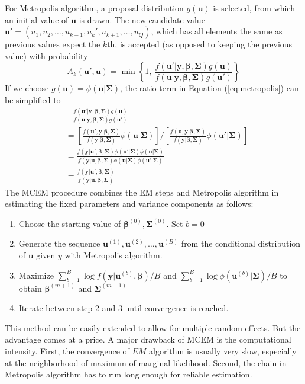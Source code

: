 For Metropolis algorithm, a proposal distribution $g(\bm u)$ is selected, from which an initial
value of $\bm u$ is drawn. The new candidate value $\bm u' = (u_1, u_2, \ldots,u_{k-1}, u_k',
u_{k+1}, \ldots, u_Q)$, which has all elements the same as previous values expect the $k$th,   is
accepted (as opposed to keeping the previous value) with probability
\begin{equation}\label{eq:metropolis}
A_k(\bm u', \bm u) = \min \left\{1, ~\frac{f(\bm u'|\bm y, \bm \beta, \bm \Sigma)g(\bm u)}{f(\bm
	u|\bm y, \bm \beta, \bm \Sigma)g(\bm u')}\right\}
\end{equation}
If we choose $g(\bm u) = \phi (\bm u|\bm\Sigma)$, the ratio term in Equation (\ref{eq:metropolis})
can be simplified to 
\begin{equation}\label{eq2.3.4}
\begin{aligned}
& ~~~~\frac{f(\bm u'|\bm y, \bm \beta, \bm \Sigma)g(\bm u)}{f(\bm u|\bm y, \bm \beta, \bm
	\Sigma)g(\bm u')} \\
& = \left[\frac{f(\bm u', \bm y| \bm \beta, \bm \Sigma)}{f(\bm y| \bm \beta, \bm \Sigma)}\phi (\bm
u|\bm\Sigma)\right]/\left[
\frac{f(\bm u, \bm y|\bm \beta, \bm \Sigma)}{f(\bm y|\bm \beta, \bm \Sigma)}\phi (\bm
u'|\bm\Sigma)\right]\\
& = \frac{f(\bm y|\bm u', \bm \beta, \bm \Sigma)\phi (\bm u'|\bm\Sigma)\phi (\bm
	u|\bm\Sigma)}{f(\bm y|\bm u, \bm \beta, \bm \Sigma)\phi (\bm u|\bm\Sigma)\phi (\bm u'|\bm\Sigma)}\\
& = \frac{f(\bm y|\bm u', \bm \beta, \bm \Sigma)}{f(\bm y|\bm u, \bm \beta, \bm \Sigma)}
\end{aligned}
\end{equation}
The MCEM procedure combines the EM steps and Metropolis algorithm in estimating the fixed
parameters and variance components as follows:
\begin{enumerate}
	\item Choose the starting value of $\bm \beta^{(0)}, \bm \Sigma^{(0)}$. Set $b= 0$
	\item Generate the sequence $\bm u^{(1)}, \bm u^{(2)}, \ldots, \bm u^{(B)}$ from the conditional
	distribution of $\bm u$ given $y$ with Metropolis algorithm.
	\item Maximize $\sum_{b=1}^B \log f(\bm y|\bm u^{(b)}, \bm\beta)/B$ and $\sum_{b=1}^B\log\phi(\bm
	u^{(b)}|\bm \Sigma)/B$ to obtain $\bm \beta^{(m+1)}$ and $\bm\Sigma^{(m+1)}$
	\item Iterate between step 2 and 3 until convergence is reached.
\end{enumerate}
This method can be easily extended to allow for multiple random effects. But the advantage comes
at a price. A major drawback of MCEM is the computational intensity.  First, the convergence of $EM$
algorithm is usually very slow, especially at the neighborhood of maximum of marginal likelihood.
Second, the chain in Metropolis algorithm has to run long enough for reliable estimation. 

